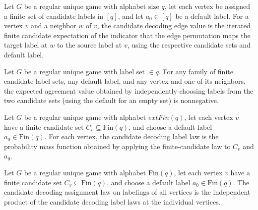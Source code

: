 \begin{definition}
\label{FABL.RegularUniqueGame.candidateDecodingEdgeValue}
\leanok
{}
Let $G$ be a regular unique game with alphabet size $q$, let each vertex be assigned a
finite set of candidate labels in $[q]$, and let $a_0\in[q]$ be a default label. For a
vertex $v$ and a neighbor $w$ of $v$, the candidate decoding edge value is the iterated
finite candidate expectation of the indicator that the edge permutation maps the target
label at $w$ to the source label at $v$, using the respective candidate sets and default
label.
\end{definition}

\begin{theorem}
\label{FABL.RegularUniqueGame.candidateDecodingEdgeValue_nonneg}
\leanok
{}
Let $G$ be a regular unique game with label set $\in q$. For any family of finite
candidate-label sets, any default label, and any vertex and one of its neighbors, the
expected agreement value obtained by independently choosing labels from the two
candidate sets (using the default for an empty set) is nonnegative.
\end{theorem}

\begin{definition}
\label{FABL.RegularUniqueGame.candidateDecodingLabelLaw}
\leanok
{}
Let $G$ be a regular unique game with alphabet $	ext{Fin}(q)$, let each vertex $v$ have
a finite candidate set $C_v\subseteq \text{Fin}(q)$, and choose a default label
$a_0\in\text{Fin}(q)$. For each vertex, the candidate decoding label law is the
probability mass function obtained by applying the finite-candidate law to $C_v$ and
$a_0$.
\end{definition}

\begin{definition}
\label{FABL.RegularUniqueGame.candidateDecodingAssignmentLaw}
\leanok
{}
Let $G$ be a regular unique game with alphabet $\text{Fin}(q)$, let each vertex $v$ have
a finite candidate set $C_v\subseteq \text{Fin}(q)$, and choose a default label
$a_0\in\text{Fin}(q)$. The candidate decoding assignment law on labelings of all
vertices is the independent product of the candidate decoding label laws at the
individual vertices.
\end{definition}

